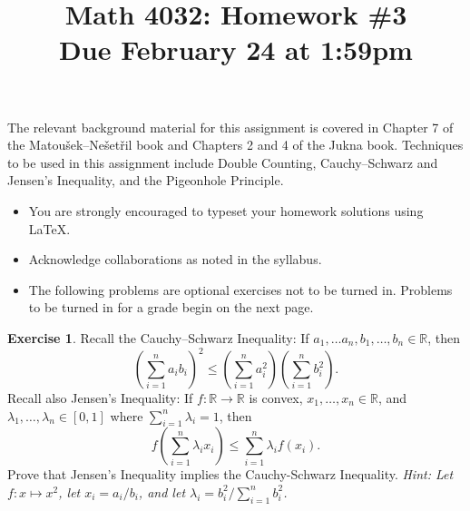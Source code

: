 \documentclass[11pt, letter]{amsart}
\title[Math 4032: Homework \#3\qquad Due February 24 at 1:59pm]{Math 4032: Homework \#3\\
  Due February 24 at 1:59pm}
\theoremstyle{definition}
\newtheorem{exercise}{Exercise}[]
\begin{document}
\maketitle

The relevant background material for this assignment is covered in Chapter 7 of the Matou\v{s}ek--Ne\v{s}et\v{r}il book and Chapters 2 and 4 of the Jukna book.  Techniques to be used in this assignment include Double Counting, Cauchy--Schwarz and Jensen's Inequality, and the Pigeonhole Principle.
\begin{itemize}
\item You are strongly encouraged to typeset your homework solutions using \LaTeX.
\item Acknowledge collaborations as noted in the syllabus.
\item The following problems are optional exercises not to be turned in.  Problems to be turned in for a grade begin on the next page.  
\end{itemize}


\begin{exercise}
  Recall the Cauchy--Schwarz Inequality: If $a_1, \dots a_n, b_1, \dots, b_n \in \mathbb R$, then
  \begin{equation*}
    \left(\sum_{i=1}^n a_ib_i\right)^2 \leq \left(\sum_{i=1}^n a_i^2\right)\left(\sum_{i=1}^n b_i^2\right).
  \end{equation*}
  Recall also Jensen's Inequality: If $f : \mathbb R \rightarrow \mathbb R$ is convex, $x_1, \dots, x_n \in \mathbb R$, and $\lambda_1, \dots, \lambda_n \in [0, 1]$ where $\sum_{i=1}^n \lambda_i = 1$, then
  \begin{equation*}
    f\left(\sum_{i=1}^n\lambda_i x_i\right) \leq \sum_{i=1}^n \lambda_i f(x_i).
  \end{equation*}
  Prove that Jensen's Inequality implies the Cauchy-Schwarz Inequality.  \textit{Hint: Let $f : x \mapsto x^2$, let $x_i = a_i / b_i$, and let $\lambda_i = b_i^2 / \sum_{i=1}^n b_i^2$.}
\end{exercise}
\end{document}
